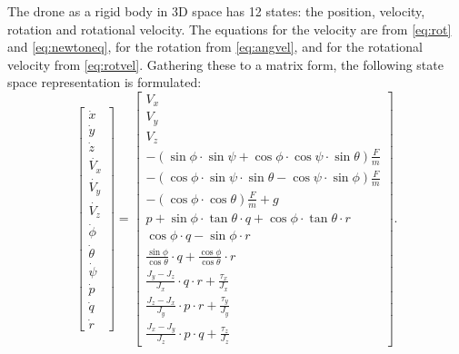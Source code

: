 The drone as a rigid body in 3D space has 12 states: the position, velocity, rotation and rotational velocity. The equations for the velocity are from \eqref{eq:rot} and \eqref{eq:newtoneq}, for the rotation from \eqref{eq:angvel}, and for the rotational velocity from \eqref{eq:rotvel}. Gathering these to a matrix form, the following state space representation is formulated:
\begin{equation}\label{eq:ss}
\begin{bmatrix}
\dot{x} \\ \dot{y} \\ \dot{z} \\ \dot{V_x} \\ \dot{V_y} \\ \dot{V_z} \\ \dot{\phi} \\ \dot{\theta} \\ \dot{\psi} \\ \dot{p} \\ \dot{q} \\ \dot{r}
\end{bmatrix} = \begin{bmatrix}
V_x \\ V_y \\ V_z \\ -(\sin \phi \cdot \sin \psi+\cos \phi \cdot \cos \psi \cdot \sin \theta) \frac{F}{m} \\
-(\cos \phi \cdot \sin \psi \cdot \sin \theta-\cos \psi \cdot \sin \phi) \frac{F}{m} \\
-(\cos \phi \cdot \cos \theta) \frac{F}{m}+g \\
p+\sin \phi \cdot \tan \theta \cdot q+\cos \phi \cdot \tan \theta \cdot r \\
\cos \phi \cdot q-\sin \phi \cdot r \\
\frac{\sin \phi}{\cos \theta} \cdot q+\frac{\cos \phi}{\cos \theta} \cdot r \\
\frac{J_{y}-J_{z}}{J_{x}} \cdot q \cdot r+\frac{\tau_{x}}{J_{x}} \\
\frac{J_{z}-J_{x}}{J_{y}} \cdot p \cdot r+\frac{\tau_{y}}{J_{y}} \\
\frac{J_{x}-J_{y}}{J_{z}} \cdot p \cdot q+\frac{\tau_{z}}{J_{z}}
\end{bmatrix}.
\end{equation}


